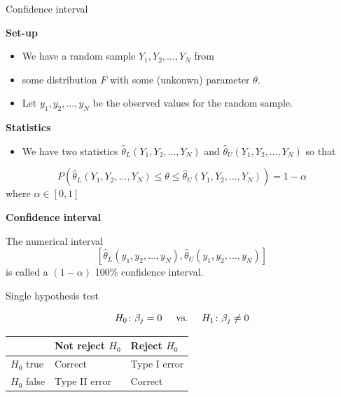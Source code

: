 \documentclass[
  ignorenonframetext,
]{beamer}
\providecommand{\tightlist}{%
  \setlength{\itemsep}{0pt}\setlength{\parskip}{0pt}}
\begin{document}
\begin{frame}

\begin{block}{Confidence interval}

\textbf{Set-up}

\begin{itemize}
\tightlist
\item
  We have a random sample \(Y_1,Y_2,\ldots,Y_N\) from
\item
  some distribution \(F\) with some (unkonwn) parameter \(\theta\).
\item
  Let \(y_1,y_2,\ldots,y_N\) be the observed values for the random
  sample.
\end{itemize}

\textbf{Statistics}

\begin{itemize}
\tightlist
\item
  We have two statistics \(\hat{\theta}_L(Y_1,Y_2,\ldots,Y_N)\) and
  \(\hat{\theta}_U(Y_1,Y_2,\ldots,Y_N)\) so that
\end{itemize}

\[P(\hat{\theta}_L(Y_1,Y_2,\ldots,Y_N)\le \theta \le \hat{\theta}_U(Y_1,Y_2,\ldots,Y_N))=1-\alpha\]
where \(\alpha\in [0,1]\)

\textbf{Confidence interval}

The numerical interval
\[[\hat{\theta}_L(y_1,y_2,\ldots,y_N),\hat{\theta}_U(y_1,y_2,\ldots,y_N)]\]
is called a \((1-\alpha)\) 100\% confidence interval.

\end{block}

\end{frame}

\begin{frame}

\begin{block}{Single hypothesis test}

\[H_{0}\colon \beta_j=0 \hspace{0.5cm} \text{vs.} \hspace{0.5cm} H_{1}\colon \beta_j \neq 0\]

\begin{longtable}[]{@{}lll@{}}
\toprule
& Not reject \(H_0\) & Reject \(H_0\)\tabularnewline
\midrule
\endhead
\(H_0\) true & Correct & Type I error\tabularnewline
\(H_0\) false & Type II error & Correct\tabularnewline
\bottomrule
\end{longtable}

\end{block}

\end{frame}
\end{document}
